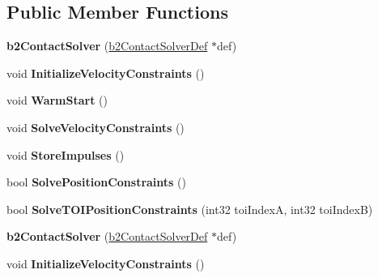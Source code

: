 \subsection*{Public Member Functions}
\begin{DoxyCompactItemize}
\item 
\mbox{\label{classb2ContactSolver_ac89198165ed16eb6080d84f93229ea88}} 
{\bfseries b2\+Contact\+Solver} (\hyperlink{structb2ContactSolverDef}{b2\+Contact\+Solver\+Def} $\ast$def)
\item 
\mbox{\label{classb2ContactSolver_a56fc9a51a49879dc2dadd5c33ed70b0c}} 
void {\bfseries Initialize\+Velocity\+Constraints} ()
\item 
\mbox{\label{classb2ContactSolver_aa96052cd2f709bfc416148fefb028522}} 
void {\bfseries Warm\+Start} ()
\item 
\mbox{\label{classb2ContactSolver_abec74e1246fdbfddbd2236602da63e1f}} 
void {\bfseries Solve\+Velocity\+Constraints} ()
\item 
\mbox{\label{classb2ContactSolver_aff5922a65bb5ccf473c425719bb8938d}} 
void {\bfseries Store\+Impulses} ()
\item 
\mbox{\label{classb2ContactSolver_a4696834a137001bc74faec643b117031}} 
bool {\bfseries Solve\+Position\+Constraints} ()
\item 
\mbox{\label{classb2ContactSolver_a6604c8fc034f89ad2e3461f4b5c20844}} 
bool {\bfseries Solve\+T\+O\+I\+Position\+Constraints} (int32 toi\+IndexA, int32 toi\+IndexB)
\item 
\mbox{\label{classb2ContactSolver_ac89198165ed16eb6080d84f93229ea88}} 
{\bfseries b2\+Contact\+Solver} (\hyperlink{structb2ContactSolverDef}{b2\+Contact\+Solver\+Def} $\ast$def)
\item 
\mbox{\label{classb2ContactSolver_a56fc9a51a49879dc2dadd5c33ed70b0c}} 
void {\bfseries Initialize\+Velocity\+Constraints} ()
\item 
\mbox{\label{classb2ContactSolver_aa96052cd2f709bfc416148fefb028522}} 

\end{DoxyCompactItemize}
